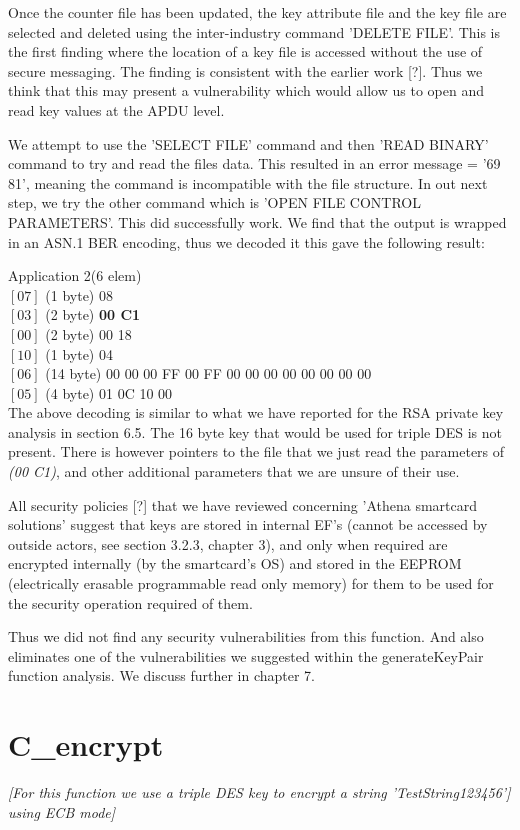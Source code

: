 \documentclass[bsc,frontabs,twoside,singlespacing,parskip,deptreport]{infthesis}     %
\begin{document}
Once the counter file has been updated, the key attribute file and the key file are selected and deleted using the inter-industry command 'DELETE FILE'. This is the first finding where the location of a key file  is accessed without the use of secure messaging. The finding is consistent with the earlier work [?]. Thus we think that this may present a vulnerability which would allow us to open and read key values at the APDU level. 

We attempt to use the 'SELECT FILE' command and then 'READ BINARY' command to try and read the files data. This resulted in an error message = '69 81', meaning the command is incompatible with the file structure. In out next step, we try the other command which is 'OPEN FILE CONTROL PARAMETERS'. This did successfully work. We find that the output is wrapped in an ASN.1 BER encoding, thus we decoded it this gave the following result:

Application 2(6 elem)\\
$[07]$ (1 byte) 08\\
$[03]$ (2 byte) \textbf{00 C1}\\
$[00]$ (2 byte) 00 18\\
$[10]$ (1 byte) 04\\
$[06]$ (14 byte) 00 00 00 FF 00 FF 00 00 00 00 00 00 00 00\\
$[05]$ (4 byte) 01 0C 10 00\\

The above decoding is similar to what we have reported for the RSA private key analysis in section 6.5. The 16 byte key that would be used for triple DES is not present. There is however pointers to the file that we just read the parameters of \textit{(00 C1)}, and other additional parameters that we are unsure of their use. 

All security policies [?] that we have reviewed concerning 'Athena smartcard solutions' suggest that keys are stored in internal EF's (cannot be accessed by outside actors, see section 3.2.3, chapter 3), and only when required are encrypted internally (by the smartcard's OS) and stored in the EEPROM (electrically erasable programmable read only memory) for them to be used for the security operation required of them. 

Thus we did not find any security vulnerabilities from this function. And also eliminates one of the vulnerabilities we suggested within the generateKeyPair function analysis. We discuss further in chapter 7.

\section{C\_encrypt}
\textit{[For this function we use a triple DES key to encrypt a string 'TestString123456'] using ECB mode]}
\end{document}
